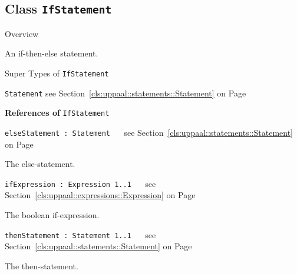 \subsection{Class \bfseries \texttt{IfStatement}\normalfont}
\label{cls:uppaal::statements::IfStatement} 
	
	\begin{longdescription}
		\item[Overview] 		
				

	

		An if-then-else statement.		
		\item[Super Types of \texttt{IfStatement}] ~
			\begin{longdescription}
				\item[\texttt{Statement}] see Section~\ref{cls:uppaal::statements::Statement} on Page~\pageref{cls:uppaal::statements::Statement}						\end{longdescription}
		
	
			\item[\textbf{References of} \texttt{IfStatement}] ~
			\begin{longdescription}
	\item[\texttt{elseStatement : Statement 	}] ~
	see Section~\ref{cls:uppaal::statements::Statement} on Page~\pageref{cls:uppaal::statements::Statement}
	
	\nopagebreak
		
				

	

		The else-statement.		
	\item[\texttt{ifExpression : Expression 	\symbol{"5B}1..1\symbol{"5D}
}] ~
	see Section~\ref{cls:uppaal::expressions::Expression} on Page~\pageref{cls:uppaal::expressions::Expression}
	
	\nopagebreak
		
				

	

		The boolean if-expression.		
	\item[\texttt{thenStatement : Statement 	\symbol{"5B}1..1\symbol{"5D}
}] ~
	see Section~\ref{cls:uppaal::statements::Statement} on Page~\pageref{cls:uppaal::statements::Statement}
	
	\nopagebreak
		
				

	

		The then-statement.		
			\end{longdescription}
	
	\end{longdescription}
	

